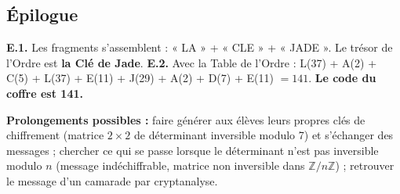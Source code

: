 \documentclass[11pt,a4paper]{article}
\newcommand{\Z}{\mathbb{Z}}
\begin{document}
\subsection*{Épilogue}
\textbf{E.1.} Les fragments s'assemblent : « LA » + « CLE » + « JADE ».
Le trésor de l'Ordre est \textbf{la Clé de Jade}.
\textbf{E.2.} Avec la Table de l'Ordre :
L(37) + A(2) + C(5) + L(37) + E(11) + J(29) + A(2) + D(7) + E(11)
$= 141$.
\textbf{Le code du coffre est 141.}

\vspace{3mm}
\begin{conseil}
	\textbf{Prolongements possibles :} faire générer aux élèves leurs propres
	clés de chiffrement (matrice $2\times2$ de déterminant inversible modulo 7)
	et s'échanger des messages ; chercher ce qui se passe lorsque le
	déterminant n'est pas inversible modulo $n$ (message indéchiffrable,
	matrice non inversible dans $\Z/n\Z$) ; retrouver le message d'un camarade
	par cryptanalyse.
\end{conseil}
\end{document}
